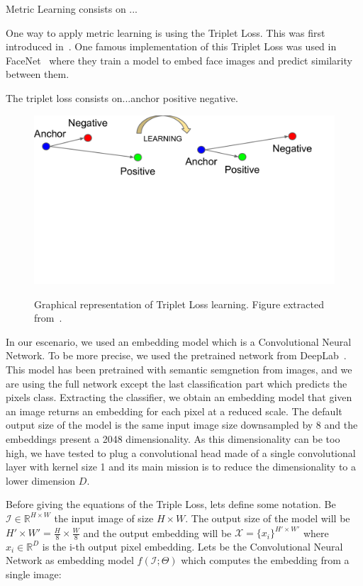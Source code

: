Metric Learning consists on ...

One way to apply metric learning is using the Triplet Loss. This was first introduced in~\cite{balntas2016learning}.
One famous implementation of this Triplet Loss was used in FaceNet~\cite{schroff2015facenet} where they train a model to embed face images and predict similarity between them.

The triplet loss consists on...anchor positive negative.

\begin{figure}[h]
  \centering
  \includegraphics[trim=1cm 10cm 2.5cm 0cm, width=0.7\linewidth]{figures/methods/triplet_loss/triplet_viz.pdf}
  \label{fig:triplet_loss_viz}
  \caption{
    Graphical representation of Triplet Loss learning.
    Figure extracted from~\cite{schroff2015facenet}. }
\end{figure}

In our escenario, we used an embedding model which is a Convolutional Neural Network.
To be more precise, we used the pretrained network from DeepLab~\cite{chen2018deeplab}.
This model has been pretrained with semantic semgnetion from images, and we are using the full network except the last classification part which predicts the pixels class.
Extracting the classifier, we obtain an embedding model that given an image returns an embedding for each pixel at a reduced scale.
The default output size of the model is the same input image size downsampled by 8 and the embeddings present a 2048 dimensionality.
As this dimensionality can be too high, we have tested to plug a convolutional head made of a single convolutional layer with kernel size 1 and its main mission is to reduce the dimensionality to a lower dimension $D$.

Before giving the equations of the Triple Loss, lets define some notation.
Be $\mathcal{I} \in \mathbb{R}^{H \times W}$ the input image of size $H \times W$.
The output size of the model will be $H' \times W' = \frac{H}{8} \times \frac{W}{8}$ and the output embedding will be $\mathcal{X} = \{x_i\}^{H' \times W'}$ where $x_i \in \mathbb{R}^D$ is the i-th output pixel embedding.
Lets be the Convolutional Neural Network as embedding model $f(\mathcal{I}; \Theta)$ which computes the embedding from a single image:

